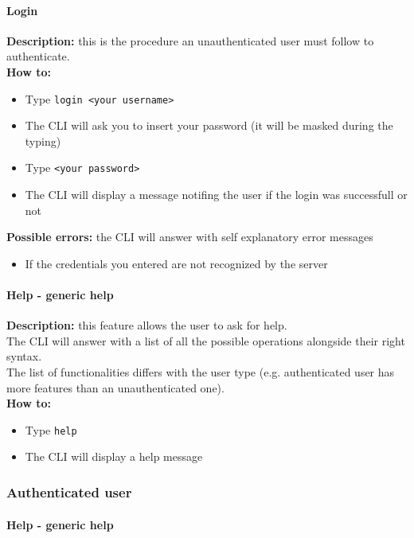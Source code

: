 \documentclass{scalatekids-article}
\begin{document}
\paragraph{Login}

\textbf{Description:} this is the procedure an unauthenticated user must follow to authenticate.\\
\textbf{How to:}
\begin{itemize}
\item Type \texttt{login <your username>}
\item The CLI will ask you to insert your password (it will be masked during the typing)
\item Type \texttt{<your password>}
\item The CLI will display a message notifing the user if the login was successfull or not
\end{itemize}
\textbf{Possible errors:} the CLI will answer with self explanatory error messages
\begin{itemize}
\item If the credentials you entered are not recognized by the server
\end{itemize}

\paragraph{Help - generic help}
\label{sec:generichelp}
\textbf{Description:} this feature allows the user to ask for help.\\
The CLI will answer with a list of all the possible operations alongside
their right syntax.\\
The list of functionalities differs with the user type (e.g. authenticated user has more features than an unauthenticated one).\\
\textbf{How to:}
\begin{itemize}
\item Type \texttt{help}
\item The CLI will display a help message
\end{itemize}

\subsubsection{Authenticated user}
\label{sec:authenticateduser}

\paragraph{Help - generic help}
\end{document}
